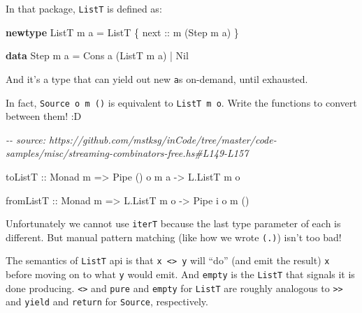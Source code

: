\documentclass[]{article}
\newenvironment{Shaded}{}{}
\newcommand{\CommentTok}[1]{\textcolor[rgb]{0.38,0.63,0.69}{\textit{#1}}}
\newcommand{\DataTypeTok}[1]{\textcolor[rgb]{0.56,0.13,0.00}{#1}}
\newcommand{\KeywordTok}[1]{\textcolor[rgb]{0.00,0.44,0.13}{\textbf{#1}}}
\newcommand{\NormalTok}[1]{#1}
\newcommand{\OperatorTok}[1]{\textcolor[rgb]{0.40,0.40,0.40}{#1}}
\newcommand{\OtherTok}[1]{\textcolor[rgb]{0.00,0.44,0.13}{#1}}
\begin{document}
\begin{enumerate}
  In that package, \texttt{ListT} is defined as:

\begin{Shaded}
\begin{Highlighting}[]
\KeywordTok{newtype} \DataTypeTok{ListT}\NormalTok{ m a }\OtherTok{=} \DataTypeTok{ListT}\NormalTok{ \{}\OtherTok{ next ::}\NormalTok{ m (}\DataTypeTok{Step}\NormalTok{ m a) \}}

\KeywordTok{data} \DataTypeTok{Step}\NormalTok{ m a }\OtherTok{=} \DataTypeTok{Cons}\NormalTok{ a (}\DataTypeTok{ListT}\NormalTok{ m a) }\OperatorTok{|} \DataTypeTok{Nil}
\end{Highlighting}
\end{Shaded}

  And it's a type that can yield out new \texttt{a}s on-demand, until exhausted.

  In fact, \texttt{Source\ o\ m\ ()} is equivalent to \texttt{ListT\ m\ o}.
  Write the functions to convert between them! :D

\begin{Shaded}
\begin{Highlighting}[]
\CommentTok{{-}{-} source: https://github.com/mstksg/inCode/tree/master/code{-}samples/misc/streaming{-}combinators{-}free.hs\#L149{-}L157}

\OtherTok{toListT ::} \DataTypeTok{Monad}\NormalTok{ m }\OtherTok{=>} \DataTypeTok{Pipe}\NormalTok{ () o m a }\OtherTok{{-}>} \DataTypeTok{L.ListT}\NormalTok{ m o}

\OtherTok{fromListT ::} \DataTypeTok{Monad}\NormalTok{ m }\OtherTok{=>} \DataTypeTok{L.ListT}\NormalTok{ m o }\OtherTok{{-}>} \DataTypeTok{Pipe}\NormalTok{ i o m ()}
\end{Highlighting}
\end{Shaded}

  Unfortunately we cannot use \texttt{iterT} because the last type parameter of
  each is different. But manual pattern matching (like how we wrote
  \texttt{(.\textbar{})}) isn't too bad!

  The semantics of \texttt{ListT} api is that
  \texttt{x\ \textless{}\textbar{}\textgreater{}\ y} will ``do'' (and emit the
  result) \texttt{x} before moving on to what \texttt{y} would emit. And
  \texttt{empty} is the \texttt{ListT} that signals it is done producing.
  \texttt{\textless{}\textbar{}\textgreater{}} and \texttt{pure} and
  \texttt{empty} for \texttt{ListT} are roughly analogous to
  \texttt{\textgreater{}\textgreater{}} and \texttt{yield} and \texttt{return}
  for \texttt{Source}, respectively.
\end{enumerate}
\end{document}
